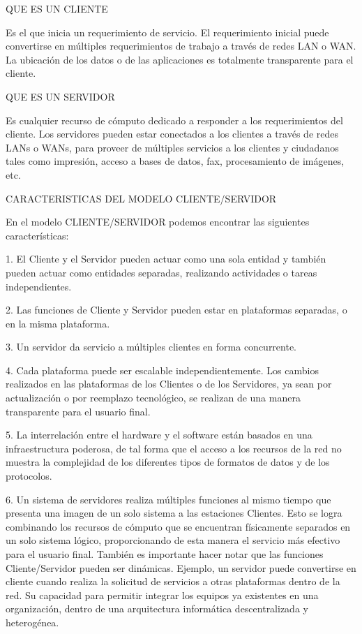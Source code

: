 QUE ES UN CLIENTE

Es el que inicia un requerimiento de servicio. El requerimiento inicial puede convertirse en múltiples requerimientos de trabajo a 
través de redes LAN o WAN. La ubicación de los datos o de las aplicaciones es totalmente transparente para el cliente.

QUE ES UN SERVIDOR

Es cualquier recurso de cómputo dedicado a responder a los requerimientos del cliente. Los servidores pueden estar conectados a 
los clientes a través de redes LANs o WANs, para proveer de múltiples servicios a los clientes y ciudadanos tales como impresión, 
acceso a bases de datos, fax, procesamiento de imágenes, etc.

CARACTERISTICAS DEL MODELO CLIENTE/SERVIDOR

En el modelo CLIENTE/SERVIDOR podemos encontrar las siguientes características:

1. El Cliente y el Servidor pueden actuar como una sola entidad y también pueden actuar como entidades separadas, realizando 
actividades o tareas independientes.

2. Las funciones de Cliente y Servidor pueden estar en plataformas separadas, o en la misma plataforma.

3. Un servidor da servicio a múltiples clientes en forma concurrente.

4. Cada plataforma puede ser escalable independientemente. Los cambios realizados en las plataformas de los Clientes o de 
los Servidores, ya sean por actualización o por reemplazo tecnológico, se realizan de una manera transparente para el usuario final.

5. La interrelación entre el hardware y el software están basados en una infraestructura poderosa, de tal forma que el acceso a
los recursos de la red no muestra la complejidad de los diferentes tipos de formatos de datos y de los protocolos.

6. Un sistema de servidores realiza múltiples funciones al mismo tiempo que presenta una imagen de un solo sistema a las estaciones 
Clientes. Esto se logra combinando los recursos de cómputo que se encuentran físicamente separados en un solo sistema lógico, 
proporcionando de esta manera el servicio más efectivo para el usuario final.
También es importante hacer notar que las funciones Cliente/Servidor pueden ser dinámicas. Ejemplo, un servidor puede convertirse en 
cliente cuando realiza la solicitud de servicios a otras plataformas dentro de la red.
Su capacidad para permitir integrar los equipos ya existentes en una organización, dentro de una arquitectura informática 
descentralizada y heterogénea.

